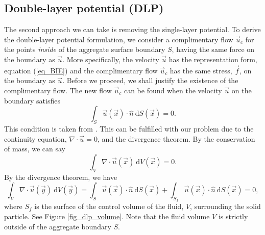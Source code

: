 \subsection{Double-layer potential (DLP)}
The second approach we can take is removing the single-layer potential. 
To derive the double-layer potential formulation, we consider a complimentary flow $\vec{u}_c$ 
for the points \textit{inside} of the aggregate surface boundary $S$, having the same force on the boundary as $\vec{u}$. More specifically, the velocity $\vec{u}$  has the representation form, equation (\ref{eq_BIE}) and the complimentary flow $\vec{u}_c$ has the same stress, $\vec{f}$, on the boundary as $\vec{u}$. Before we proceed, we shall justify the existence of the complimentary flow.
The new flow $\vec{u}_c$ can be found when the velocity $\vec{u}$ on the boundary satisfies
\begin{equation}
 	\int_S \vec{u}(\vec{x}) \cdot \hat{n} \ \text{d}S(\vec{x})=0. 
	\label{eq_dlp_constraint}
\end{equation}
This condition is taken from \cite{pozrikidis_boundary_1992}.
This can be fulfilled with our problem due to the continuity equation, $\nabla \cdot \vec{u}= 0$, and the divergence theorem.
By the conservation of mass, we can say
\begin{equation}
 	\int_V  \nabla \cdot \vec{u}(\vec{x}) \ \text{d}V (\vec{x}) 
		=0. 
	\label{eq_constraint_v}
\end{equation}
By the divergence theorem, we have
\begin{equation}
	\int_V  \nabla \cdot \vec{u}(\vec{y}) \ \text{d}V (\vec{y})   = 
\int_{S } \vec{u}(\vec{x}) \cdot \hat{n} \ \text{d}S(\vec{x})
+ \int_{S_f} \vec{u}(\vec{x}) \cdot \hat{n} \ \text{d}S(\vec{x})=0,
\label{eq_div}
\end{equation}
where $S_f$ is the surface of the control volume of the fluid, $V$, surrounding the solid particle. See Figure \ref{fig_dlp_volume}.
Note that the fluid volume $V$ is strictly outside of the aggregate boundary $S$. 
